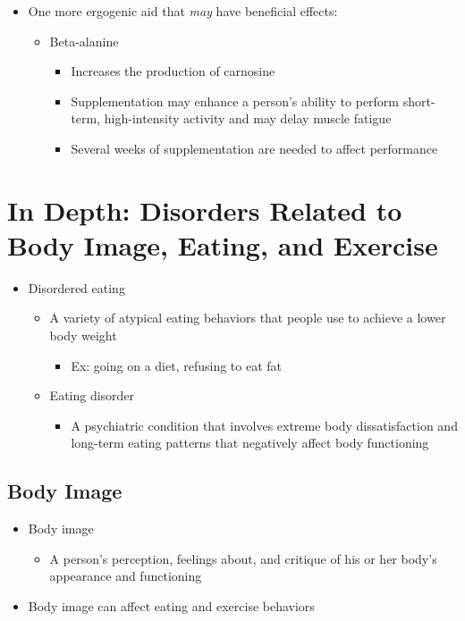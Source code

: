 \documentclass[title={Chapter 11}]{fdsn201notes}
\begin{document}
\begin{itemize}
\begin{itemize}
\begin{itemize}
		\end{itemize}
	\end{itemize}
	\item One more ergogenic aid that \emph{may} have beneficial effects:
	\begin{itemize}
		\item Beta-alanine
		\begin{itemize}
			\item Increases the production of carnosine
			\item Supplementation may enhance a person’s ability to perform short-term, high-intensity activity and may delay muscle fatigue
			\item Several weeks of supplementation are needed to affect performance
		\end{itemize}
	\end{itemize}
\end{itemize}

\section{In Depth: Disorders Related to Body Image, Eating, and Exercise}\label{sec:in-depth:-disorders-related-to-body-image-eating-and-exercise}
\begin{itemize}
	\item Disordered eating
	\begin{itemize}
		\item A variety of atypical eating behaviors that people use to achieve a lower body weight
		\begin{itemize}
			\item Ex: going on a diet, refusing to eat fat
		\end{itemize}
		\item Eating disorder
		\begin{itemize}
			\item A psychiatric condition that involves extreme body dissatisfaction and long-term eating patterns that negatively affect body functioning
		\end{itemize}
	\end{itemize}
\end{itemize}

\subsection{Body Image}\label{subsec:body-image}
\begin{itemize}
	\item Body image
	\begin{itemize}
		\item A person’s perception, feelings about, and critique of his or her body’s appearance and functioning
	\end{itemize}
	\item Body image can affect eating and exercise behaviors
\end{itemize}
\end{document}
